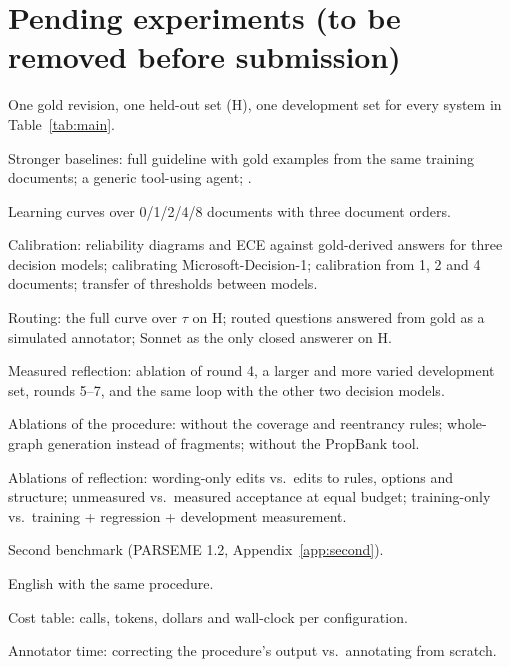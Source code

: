 \section{Pending experiments (to be removed before submission)}
\label{app:pending}
\begin{description}[leftmargin=1em,itemsep=1pt,font=\normalfont\bfseries]
  \item[E1] One gold revision, one held-out set (H), one development set for every system in Table~\ref{tab:main}.
  \item[E2] Stronger baselines: full guideline with gold examples from the same training documents; a generic tool-using agent; \citet{chun2024pipeline}.
  \item[E3] Learning curves over 0/1/2/4/8 documents with three document orders.
  \item[E4] Calibration: reliability diagrams and ECE against gold-derived answers for three decision models; calibrating Microsoft-Decision-1; calibration from 1, 2 and 4 documents; transfer of thresholds between models.
  \item[E5] Routing: the full curve over $\tau$ on H; routed questions answered from gold as a simulated annotator; Sonnet as the only closed answerer on H.
  \item[E6] Measured reflection: ablation of round 4, a larger and more varied development set, rounds 5--7, and the same loop with the other two decision models.
  \item[E7] Ablations of the procedure: without the coverage and reentrancy rules; whole-graph generation instead of fragments; without the PropBank tool.
  \item[E8] Ablations of reflection: wording-only edits vs.\ edits to rules, options and structure; unmeasured vs.\ measured acceptance at equal budget; training-only vs.\ training + regression + development measurement.
  \item[E9] Second benchmark (PARSEME 1.2, Appendix~\ref{app:second}).
  \item[E10] English \umr with the same procedure.
  \item[E11] Cost table: calls, tokens, dollars and wall-clock per configuration.
  \item[E12] Annotator time: correcting the procedure's output vs.\ annotating from scratch.
\end{description}

